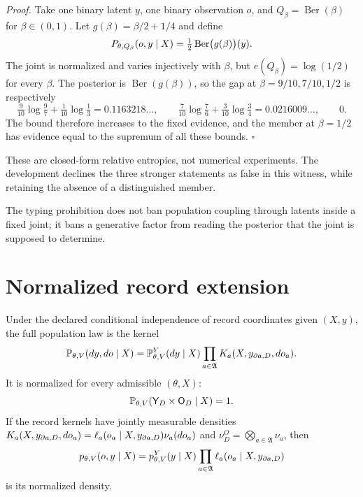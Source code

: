 \noindent\emph{Proof.}
Take one binary latent $y$, one binary observation $o$, and
$Q_\beta=\operatorname{Ber}(\beta)$ for $\beta\in(0,1)$.  Let
$g(\beta)=\beta/2+1/4$ and define
\begin{equation}
P_{\theta,Q_\beta}(o,y\mid X)
=\tfrac12\operatorname{Ber}\bigl(g(\beta)\bigr)(y).
\label{eq:gen-moving-target-witness}
\end{equation}
The joint is normalized and varies injectively with $\beta$, but
$e(Q_\beta)=\log(1/2)$ for every $\beta$.  The posterior is
$\operatorname{Ber}(g(\beta))$, so the gap at
$\beta=9/10,7/10,1/2$ is respectively
\begin{equation}
\tfrac9{10}\log\tfrac97+\tfrac1{10}\log\tfrac13
=0.1163218\ldots,
\qquad
\tfrac7{10}\log\tfrac76+\tfrac3{10}\log\tfrac34
=0.0216009\ldots,
\qquad
0.
\label{eq:gen-moving-target-values}
\end{equation}
The bound therefore increases to the fixed evidence, and the member at $\beta=1/2$ has evidence
equal to the supremum of all these bounds. \hfill$\square$

These are closed-form relative entropies, not numerical experiments.  The development declines the
three stronger statements as false in this witness, while retaining the absence of a distinguished
member. 

The typing prohibition does not ban population coupling through latents inside
a fixed joint; it bans a generative factor from reading the posterior that the
joint is supposed to determine. 

\section{Normalized record extension}
\label{sec:gen-normalization}

Under the declared conditional independence of record coordinates given $(X,y)$, the full population law is the kernel
\begin{equation}
\mathbb P_{\theta,V}(dy,do\mid X)
=
\mathbb P_{\theta,V}^{Y}(dy\mid X)
\prod_{a\in\mathfrak A}K_a(X,y_{\partial a,D},do_a).
\label{eq:gen-record-extension}
\end{equation}
It is normalized for every admissible $(\theta,X)$:
\begin{equation}
\mathbb P_{\theta,V}(\mathsf Y_D\times\mathsf O_D\mid X)=1.
\label{eq:gen-normalization}
\end{equation}
If the record kernels have jointly measurable densities
$K_a(X,y_{\partial a,D},do_a)=\ell_a(o_a\mid X,y_{\partial a,D})\nu_a(do_a)$
and $\nu_D^O=\bigotimes_{a\in\mathfrak A}\nu_a$, then
\begin{equation}
p_{\theta,V}(o,y\mid X)
=p_{\theta,V}^{Y}(y\mid X)
\prod_{a\in\mathfrak A}\ell_a(o_a\mid X,y_{\partial a,D})
\label{eq:gen-record-density}
\end{equation}
is its normalized density. 

